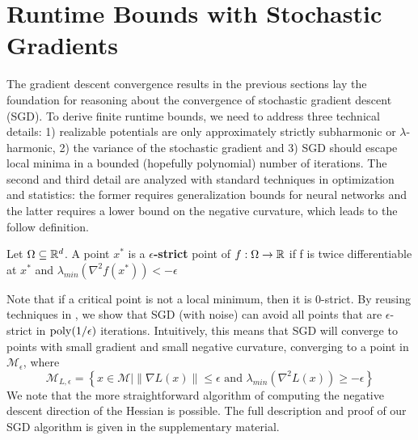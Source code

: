 
\section{Runtime Bounds with Stochastic Gradients}

The gradient descent convergence results in the previous sections lay
the foundation for reasoning about the convergence of stochastic
gradient descent (SGD). To derive finite runtime bounds, we need to
address three technical details: 1) realizable potentials are only
approximately strictly subharmonic or $\lambda$-harmonic, 2) the
variance of the stochastic gradient and 3) SGD should escape local
minima in a bounded (hopefully polynomial) number of iterations. The
second and third detail are analyzed with standard techniques in
optimization and statistics: the former requires generalization bounds
for neural networks and the latter requires a lower bound on the
negative curvature, which leads to the follow definition.
%
\begin{definition} 
Let $\Omega \subseteq {\mathbb{R}}^d$. A point $x^*$ is a
  {\bf $\epsilon$-strict} point of $f : \Omega \to {\mathbb{R}}$ if f is twice
  differentiable at $x^*$ and
  $\lambda_{min}(\nabla^2f(x^*)) < -\epsilon$
\end{definition}

Note that if a critical point is not a local minimum, then it is
$0$-strict. By reusing techniques in \cite{GeHJY15}, we show that SGD (with noise) can avoid all points that are $\epsilon$-strict in $\mathrm{poly}(1/\epsilon)$ iterations. Intuitively, this means that SGD will converge to points with small gradient and small negative curvature, converging to a point in $\mathcal{M}_\epsilon$, where 
%
\[\mathcal{M}_{L, \epsilon} = \left\{x\in \mathcal{M} \Big| \|\nabla L(x)\|
  \leq \epsilon \text{ and } \lambda_{min}(\nabla^2 L(x)) \geq
  -\epsilon\right\}\]
%
We note that the more straightforward algorithm of computing the negative descent direction of the Hessian is possible. The full description and proof of our SGD algorithm is given in the supplementary material. 

